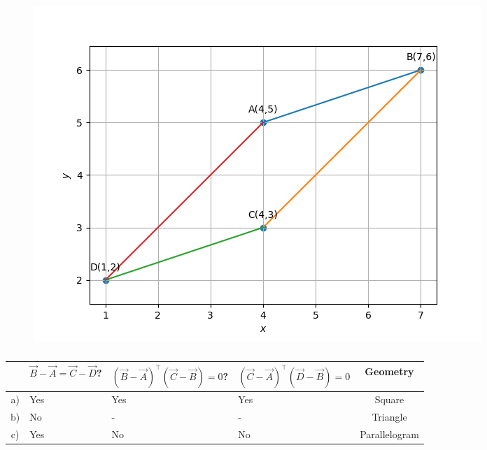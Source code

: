 %	
\begin{figure}[!ht]
	\begin{center} 
	    \includegraphics[width=\columnwidth]{chapters/10/7/1/6/figs/quad3}
	\end{center}
\caption{}
\label{fig:10/7/1/6/Fig3}
\end{figure}
%
\begin{table}[!ht]
    \centering
	    \begin{tabularx}{\columnwidth}{|c|X|X|X|c|}
        \hline
		    &{\scriptsize $\vec{B}-\vec{A} = \vec{C}-\vec{D}$?} & {\tiny $(\vec{B}-\vec{A})^\top (\vec{C}-\vec{B}) =  0$?} & {\tiny $(\vec{C}-\vec{A})^\top (\vec{D}-\vec{B}) = 0$}& \textbf{Geometry}\\
        \hline
	    a)& Yes & Yes & Yes& Square \\
        \hline
	    b)& No & -&- & Triangle\\
        \hline
	    c)&Yes & No & No & Parallelogram\\
        \hline
	\end{tabularx}
	\caption{}
	\label{tab:10/7/1/6/inner}
\end{table}
